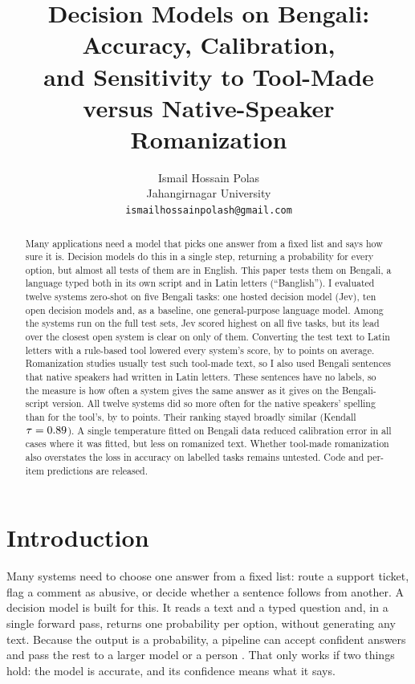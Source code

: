 \documentclass[11pt]{article}
\title{Decision Models on Bengali: Accuracy, Calibration,\\and Sensitivity to Tool-Made versus Native-Speaker Romanization}
\author{Ismail Hossain Polas\\Jahangirnagar University\\\texttt{ismailhossainpolash@gmail.com}}
\date{}
\begin{document}
\maketitle

\begin{abstract}
\noindent Many applications need a model that picks one answer from a fixed list and says how sure it is.
Decision models do this in a single step, returning a probability for every option, but almost all tests of them are in English.
This paper tests them on Bengali, a language typed both in its own script and in Latin letters (``Banglish'').
I evaluated twelve systems zero-shot on five Bengali tasks: one hosted decision model (Jev), ten open decision models and, as a baseline, one general-purpose language model.
Among the systems run on the full test sets, Jev scored highest on all five tasks, but its lead over the closest open system is clear on only \jevSepN{} of them.
Converting the test text to Latin letters with a rule-based tool lowered every system's score, by \dropMinVal{} to \dropMaxVal{} points on average.
Romanization studies usually test such tool-made text, so I also used \dakN{} Bengali sentences that native speakers had written in Latin letters.
These sentences have no labels, so the measure is how often a system gives the same answer as it gives on the Bengali-script version.
All twelve systems did so more often for the native speakers' spelling than for the tool's, by \dakRuleDiffMin{} to \dakRuleDiffMax{} points.
Their ranking stayed broadly similar (Kendall $\tau=0.89$).
A single temperature fitted on Bengali data reduced calibration error in all \tsLowered{} cases where it was fitted, but less on romanized text.
Whether tool-made romanization also overstates the loss in accuracy on labelled tasks remains untested.
Code and per-item predictions are released.
\end{abstract}

\section{Introduction}
Many systems need to choose one answer from a fixed list: route a support ticket, flag a comment as abusive, or decide whether a sentence follows from another.
A decision model is built for this.
It reads a text and a typed question and, in a single forward pass, returns one probability per option, without generating any text.
Because the output is a probability, a pipeline can accept confident answers and pass the rest to a larger model or a person \citep{deusser2026jev,nandakishore2026laya}.
That only works if two things hold: the model is accurate, and its confidence means what it says.
\end{document}
